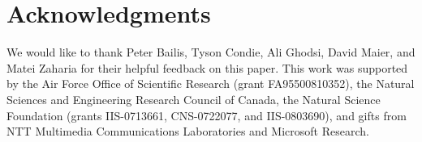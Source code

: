 \section*{Acknowledgments}
We would like to thank Peter Bailis, Tyson Condie, Ali Ghodsi, David Maier, and
Matei Zaharia for their helpful feedback on this paper.  This work was supported
by the Air Force Office of Scientific Research (grant FA95500810352), the
Natural Sciences and Engineering Research Council of Canada, the Natural Science
Foundation (grants IIS-0713661, CNS-0722077, and IIS-0803690), and gifts from
NTT Multimedia Communications Laboratories and Microsoft Research.
